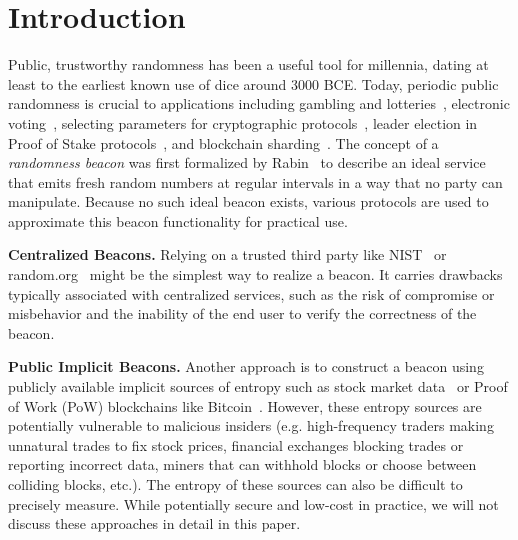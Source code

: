
\section{Introduction}
Public, trustworthy randomness has been a useful tool for millennia, dating at least to the earliest known use of dice around 3000 BCE. Today, periodic public randomness is crucial to applications including gambling and lotteries~\cite{bonneau2015bitcoin}, electronic voting~\cite{adida2008helios}, selecting parameters for cryptographic protocols~\cite{baigneres2015trap, lenstra2015random}, leader election in Proof of Stake protocols~\cite{gilad2017algorand, kiayias2017ouroboros}, and blockchain sharding~\cite{al2017chainspace, kokoris2018omniledger}. The concept of a \emph{randomness beacon} was first formalized by Rabin~\cite{rabin1983Rabin} to describe an ideal service that emits fresh random numbers at regular intervals in a way that no party can manipulate. Because no such ideal beacon exists, various protocols are used to approximate this beacon functionality for practical use.

\textbf{Centralized Beacons.} Relying on a trusted third party like NIST~\cite{fischer2011public,kelsey2019reference} or random.org~\cite{haahr2010random} might be the simplest way to realize a beacon. It carries drawbacks typically associated with centralized services, such as the risk of compromise or misbehavior and the inability of the end user to verify the correctness of the beacon.

\textbf{Public Implicit Beacons.} Another approach is to construct a beacon using publicly available implicit sources of entropy such as stock market data~\cite{clark2010use} or Proof of Work (PoW) blockchains like Bitcoin~\cite{nakamoto2008bitcoin, bentov2016bitcoin, bonneau2015bitcoin, han2020randchain}. However, these entropy sources are potentially vulnerable to malicious insiders (e.g. high-frequency traders making unnatural trades to fix stock prices, financial exchanges blocking trades or reporting incorrect data, miners that can withhold blocks or choose between colliding blocks, etc.). The entropy of these sources can also be difficult to precisely measure. While potentially secure and low-cost in practice, we will not discuss these approaches in detail in this paper.

